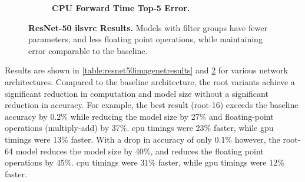 \documentclass[thesis]{subfiles}
\begin{document}
\begin{figure}[p]
\begin{subfigure}[b]{\textwidth}
			\centering
			\caption{\textbf{CPU Forward Time \vs Top-5 Error.}}
			\label{fig:resnet5050cpuforward}
		\end{subfigure}
		
		\caption[ResNet-50 \gls{ilsvrc} results]{\textbf{ResNet-50 \gls{ilsvrc} Results.} Models with filter groups have fewer parameters, and less floating point operations, while maintaining error comparable to the baseline.}
		\label{fig:resnet50plots}
	\end{figure}
	Results are shown in \cref{table:resnet50imagenetresults} and \cref{fig:resnet50plots} for various network architectures. Compared to the baseline architecture, the root variants achieve a significant reduction in computation and model size without a significant reduction in accuracy. For example, the best result (root-16) exceeds the baseline accuracy by 0.2\% while reducing the model size by 27\% and floating-point operations (multiply-add) by 37\%. \gls{cpu} timings were 23\% faster, while \gls{gpu} timings were 13\% faster. With a drop in accuracy of only 0.1\% however, the root-64 model reduces the model size by 40\%, and reduces the floating point operations by 45\%. \gls{cpu} timings were 31\% faster, while \gls{gpu} timings were 12\% faster. 
	
\end{document}
